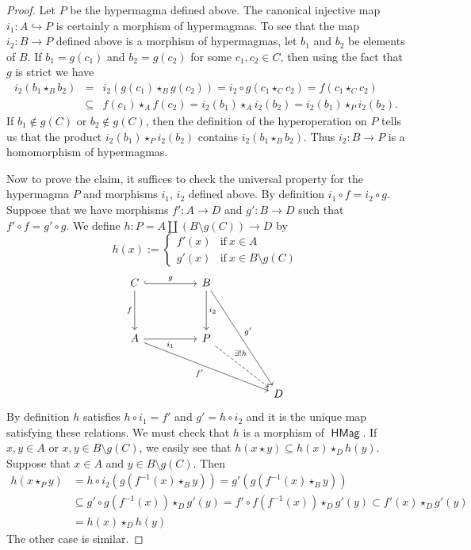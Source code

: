 \documentclass[reqno]{amsart}
\newcommand{\cat}[1]{\ensuremath{\mathsf{#1}}}
\DeclareMathOperator{\HMag}{\cat{HMag}}
\numberwithin{equation}{section}
\theoremstyle{plain}
\theoremstyle{definition}
\begin{document}
\begin{proof}
Let $P$ be the hypermagma defined above.
The canonical injective map $i_1 \colon A\hookrightarrow P$ is certainly a morphism of hypermagmas. To see that the map $i_2 \colon B\rightarrow P$ defined above is a morphism of hypermagmas, let $b_1$ and $b_2$ be elements of $B$. If $b_1=g(c_1)$ and $b_2=g(c_2)$ for some $c_1, c_2\in C$, then using the fact that $g$ is strict we have
\begin{eqnarray*}
i_2(b_1\star_B b_2)&=&i_2(g(c_1)\star_B g(c_2))=i_2\circ g(c_1\star_C c_2)=f(c_1\star_C c_2)\\
&\subseteq& f(c_1)\star_Af(c_2)=i_2(b_1)\star_Ai_2(b_2)=i_2(b_1)\star_P i_2(b_2).
\end{eqnarray*}
If $b_1\notin g(C)$ or $b_2\notin g(C)$, then the definition of the hyperoperation on $P$ tells us that the product $i_2(b_1)\star_Pi_2(b_2)$ contains $i_2(b_1\star_B b_2)$. Thus $i_2:B\rightarrow P$ is a homomorphism of hypermagmas.

Now to prove the claim, it suffices to check the universal property for the hypermagma $P$ and morphisms $i_1$, $i_2$ defined above.
By definition $i_1\circ f=i_2\circ g$. Suppose that we have morphisms $f':A\rightarrow D$ and $g':B\rightarrow D$ such that $f'\circ f=g'\circ g$. We define $h:P=A\coprod (B\setminus g(C))\rightarrow D$ by
$$h(x):=\left\{\begin{array}{llll}
f'(x) & \text{if}\ x\in A\\
g'(x) & \text{if}\ x\in B\setminus{g(C)}
\end{array}\right.$$
\[\begin{tikzcd}
	C && B \\
	\\
	A && {P} \\
	\\
	&&&& D
	\arrow["g", hook, from=1-1, to=1-3]
	\arrow["f"', from=1-1, to=3-1]
	\arrow["{i_1}"', from=3-1, to=3-3]
	\arrow["{i_2}", from=1-3, to=3-3]
	\arrow["{f'}"', from=3-1, to=5-5]
	\arrow["{g'}", from=1-3, to=5-5]
	\arrow["{\exists!h}", dashed, from=3-3, to=5-5, pos=0.3]
\end{tikzcd}\]
By definition $h$ satisfies $h\circ i_1=f'$ and $g'=h\circ i_2$ and it is the unique map satisfying these relations. We must check that $h$ is a morphism of $\HMag$. If $x, y\in A$ or $x, y\in B\setminus g(C)$, we easily see that $h(x\star y)\subseteq h(x)\star_D h(y)$. Suppose that $x\in A$ and $y\in B\setminus g(C)$. Then
\begin{align*} 
h(x\star_P y)&=h\circ i_2(g(f^{-1}(x)\star_By))=g'(g(f^{-1}(x)\star_By)) \\
& \subseteq g'\circ g(f^{-1}(x))\star_Dg'(y)
=f'\circ f(f^{-1}(x))\star_Dg'(y)\subset f'(x)\star_D g'(y) \\
&=h(x)\star_Dh(y)
\end{align*}
The other case is similar. 
\end{proof}
\end{document}
